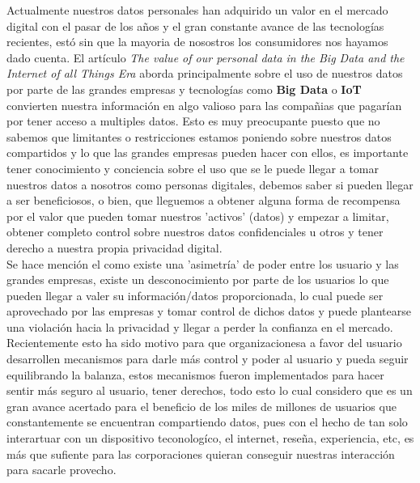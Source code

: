\documentclass[12pt]{report}
\begin{document}
\begin{enumerate}[label=\textbf{\arabic*.}, leftmargin=*]
\begin{enumerate}[label=\textbf{\alph*.}, leftmargin=*, itemsep=1.0em]
Actualmente nuestros datos personales han adquirido un valor en el mercado digital con el pasar de los años y el gran constante avance de las tecnologías recientes, estó sin que la mayoria de nosostros los consumidores nos hayamos dado cuenta. El artículo \textit{The value of our personal data in the Big Data and the Internet of all Things Era} aborda principalmente sobre el uso de nuestros datos por parte de las grandes empresas y tecnologías como \textbf{Big Data} o \textbf{IoT} convierten nuestra información en algo valioso para las compañias que pagarían por tener acceso a multiples datos. Esto es muy preocupante puesto que no sabemos que limitantes o restricciones estamos poniendo sobre nuestros datos compartidos y lo que las grandes empresas pueden hacer con ellos, es importante tener conocimiento y conciencia sobre el uso que se le puede llegar a tomar nuestros datos a nosotros como personas digitales, debemos saber si pueden llegar a ser beneficiosos, o bien, que lleguemos a obtener alguna forma de recompensa por el valor que pueden tomar nuestros 'activos' (datos) y empezar a limitar, obtener completo control sobre nuestros datos confidenciales u otros y tener derecho a nuestra propia privacidad digital.\\

Se hace mención el como existe una 'asimetría' de poder entre los usuario y las grandes empresas, existe un desconocimiento por parte de los usuarios lo que pueden llegar a valer su información/datos proporcionada, lo cual puede ser aprovechado por las empresas y tomar control de dichos datos y puede plantearse una violación hacia la privacidad y llegar a perder la confianza en el mercado. Recientemente esto ha sido motivo para que organizacionesa a favor del usuario desarrollen mecanismos para darle más control y poder al usuario y pueda seguir equilibrando la balanza, estos mecanismos fueron implementados para hacer sentir más seguro al usuario, tener derechos, todo esto lo cual considero que es un gran avance acertado para el beneficio de los miles de millones de usuarios que constantemente se encuentran compartiendo datos, pues con el hecho de tan solo interartuar con un dispositivo teconologíco, el internet, reseña, experiencia, etc, es más que sufiente para las corporaciones quieran conseguir nuestras interacción para sacarle provecho.\\


\end{enumerate}
\end{enumerate}
\end{document}
